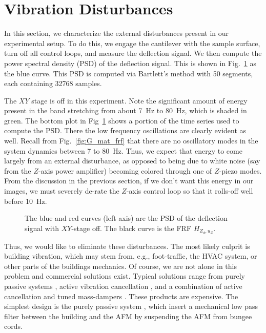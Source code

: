 
\section{Vibration Disturbances}
In this section, we characterize the external disturbances present in our experimental setup. 
To do this, we engage the cantilever with the sample surface, turn off all control loops, and measure the deflection signal. We then compute the power spectral density (PSD) of the deflection signal. This is shown in Fig.~\ref{fig:psd_xy_off} as the blue curve. This PSD is computed via Bartlett's method with 50 segments, each containing 32768 samples. 

The $XY$ stage is off in this experiment. Note the significant amount of energy present in the band stretching from about  7~Hz to 80~Hz, which is shaded in green. The bottom plot in Fig~\ref{fig:psd_xy_off} shows a portion of the time series used to compute the PSD. There the low frequency oscillations are clearly evident as well. Recall from Fig.~\ref{fig:G_mat_frf} that there are no oscillatory modes in the system dynamics between 7 to 80~Hz. Thus, we expect that energy to come largely from an external disturbance, as opposed to being due to white noise (say from the $Z$-axis power amplifier) becoming colored through one of $Z$-piezo modes. From the discussion in the previous section, if we don't want this energy in our images, we must severely de-rate the $Z$-axis control loop so that it rolls-off well before 10~Hz. 
\begin{figure}[t!]
  
  
  \caption{The blue and red curves (left axis) are the PSD of the deflection signal with $XY$-stage off. The black curve is the FRF $H_{Z_d,u_Z}$.}
  \label{fig:psd_xy_off}
\end{figure}
Thus, we would like to eliminate these disturbances. The most likely culprit is building vibration, which may stem from, e.g., foot-traffic, the HVAC system, or other parts of the buildings mechanics. Of course, we are not alone in this problem and commercial solutions exist. Typical solutions range from purely passive systems \cite{keysight_vibration}, active vibration cancellation \cite{herzan}, and a combination of active cancellation and tuned mass-dampers \cite{newport}. These products are expensive. The simplest design is the purely passive system \cite{keysight_vibration}, which insert a mechanical low pass filter between the building and the AFM by suspending the AFM from bungee cords. 

